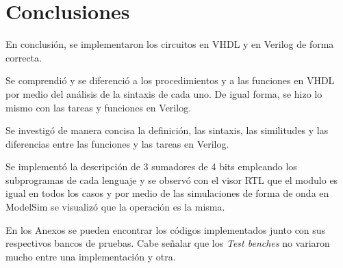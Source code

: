 \section{Conclusiones}
En conclusión, se implementaron los circuitos en VHDL y en Verilog de forma correcta.

Se comprendió y se diferenció a los procedimientos y a las funciones en VHDL por medio del análisis de la sintaxis de cada uno. De igual forma, se hizo lo mismo con las tareas y funciones en Verilog.

Se investigó de manera concisa la definición, las sintaxis, las similitudes y las diferencias entre las funciones y las tareas en Verilog.

Se implementó la descripción de 3 sumadores de 4 bits empleando los subprogramas de cada lenguaje y se observó con el visor RTL que el modulo es igual en todos los casos y por medio de las simulaciones de forma de onda en ModelSim se visualizó que la operación es la misma.

En los Anexos se pueden encontrar los códigos implementados junto con sus respectivos bancos de pruebas. Cabe señalar que los \textit{Test benches} no variaron mucho entre una implementación y otra.